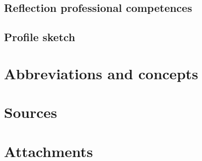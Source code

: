\documentclass[12pt,a4paper]{report}
\begin{document}
\section{Reflection professional competences}

\section{Profile sketch}

\chapter{Abbreviations and concepts}

\chapter{Sources}

\chapter{Attachments}



\end{document}
